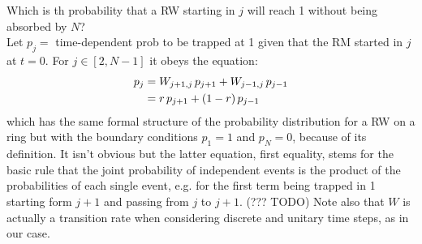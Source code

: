 \documentclass[4apaper,11pt,fleqn]{article}
\theoremstyle{remark}
\theoremstyle{definition}
\begin{document}
Which is th probability that a RW starting in $j$ will reach 1 without being absorbed by $N$?\\
Let $p_j =$ time-dependent prob to be trapped at 1 given that the RM started in $j$ at $t=0$. For $j \in [2,N-1]$ it obeys the equation:
\begin{align}
  \label{eq:pj}
  p_{j} &=W_{j+1, j} \, p_{j+1} + W_{j-1, j}\, p_{j-1} \\ \notag
  &=r\, p_{j+1}  + (1-r)\, p_{j-1}
\end{align}
which has the same formal structure of the probability distribution for a RW on a ring but with the boundary conditions $p_1 = 1$ and $p_N = 0$, because of its definition. It isn't obvious but the latter equation, first equality, stems for the basic rule that the joint probability of independent events is the product of the probabilities of each single event, e.g. for the first term being trapped in 1 starting form $j+1$ and passing from $j$ to $j+1$. (??? TODO)
Note also that $W$ is actually a transition rate when considering discrete and unitary time steps, as in our case.

\end{document}
